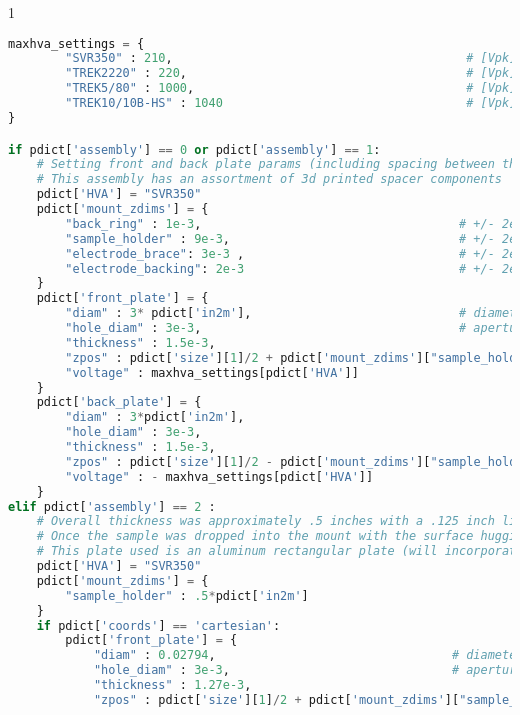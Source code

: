 \begin{spacing}{1}
\begin{lstlisting}[frame=single, language=Python]
maxhva_settings = {
        "SVR350" : 210,                                         # [Vpk]
        "TREK2220" : 220,                                       # [Vpk]
        "TREK5/80" : 1000,                                      # [Vpk]
        "TREK10/10B-HS" : 1040                                  # [Vpk]
} 

if pdict['assembly'] == 0 or pdict['assembly'] == 1:
    # Setting front and back plate params (including spacing between them and voltage on respective plates)
    # This assembly has an assortment of 3d printed spacer components
    pdict['HVA'] = "SVR350"
    pdict['mount_zdims'] = {
        "back_ring" : 1e-3,                                    # +/- 2e-4 [m]
        "sample_holder" : 9e-3,                                # +/- 2e-4 [m]
        "electrode_brace": 3e-3 ,                              # +/- 2e-4 [m]
        "electrode_backing": 2e-3                              # +/- 2e-4 [m]
    }
    pdict['front_plate'] = {
        "diam" : 3* pdict['in2m'],                             # diameter of plate [m]
        "hole_diam" : 3e-3,                                    # aperture diameter [m]
        "thickness" : 1.5e-3,
        "zpos" : pdict['size'][1]/2 + pdict['mount_zdims']["sample_holder"]/2,         # location of plate surface (com) [m]
        "voltage" : maxhva_settings[pdict['HVA']]                       # Voltage on front plate [V]
    }
    pdict['back_plate'] = {
        "diam" : 3*pdict['in2m'], 
        "hole_diam" : 3e-3,
        "thickness" : 1.5e-3, 
        "zpos" : pdict['size'][1]/2 - pdict['mount_zdims']["sample_holder"]/2,
        "voltage" : - maxhva_settings[pdict['HVA']]
    } 
elif pdict['assembly'] == 2 : 
    # Overall thickness was approximately .5 inches with a .125 inch lip on one end and .125 gap on the other end of sample.
    # Once the sample was dropped into the mount with the surface hugging the PVC lip, it was held down with a nylon set screw (with a rubberized tip)
    # This plate used is an aluminum rectangular plate (will incorporate cartesian coordinates into program soon)
    pdict['HVA'] = "SVR350"
    pdict['mount_zdims'] = {
        "sample_holder" : .5*pdict['in2m']
    }
    if pdict['coords'] == 'cartesian':
        pdict['front_plate'] = {
            "diam" : 0.02794,                                 # diameter of plate [m]
            "hole_diam" : 3e-3,                               # aperture diameter [m]
            "thickness" : 1.27e-3, 
            "zpos" : pdict['size'][1]/2 + pdict['mount_zdims']["sample_holder"]/2,    # location of plate surface (com) [m]

\end{lstlisting}
\end{spacing}
